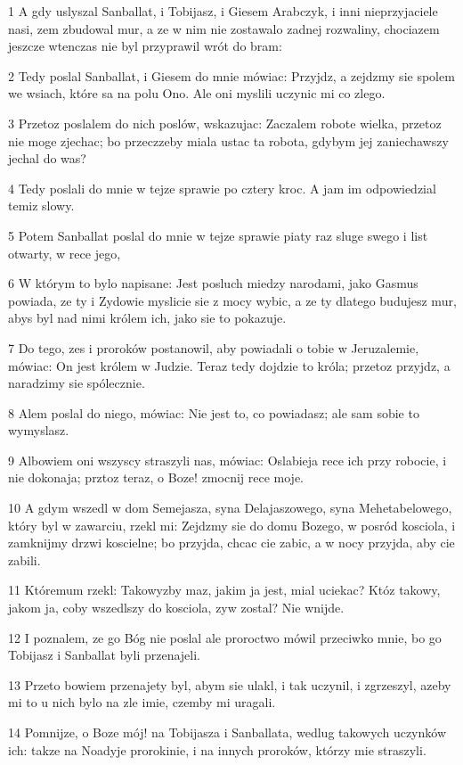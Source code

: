\par 1 A gdy uslyszal Sanballat, i Tobijasz, i Giesem Arabczyk, i inni nieprzyjaciele nasi, zem zbudowal mur, a ze w nim nie zostawalo zadnej rozwaliny, chociazem jeszcze wtenczas nie byl przyprawil wrót do bram:
\par 2 Tedy poslal Sanballat, i Giesem do mnie mówiac: Przyjdz, a zejdzmy sie spolem we wsiach, które sa na polu Ono. Ale oni myslili uczynic mi co zlego.
\par 3 Przetoz poslalem do nich poslów, wskazujac: Zaczalem robote wielka, przetoz nie moge zjechac; bo przeczzeby miala ustac ta robota, gdybym jej zaniechawszy jechal do was?
\par 4 Tedy poslali do mnie w tejze sprawie po cztery kroc. A jam im odpowiedzial temiz slowy.
\par 5 Potem Sanballat poslal do mnie w tejze sprawie piaty raz sluge swego i list otwarty, w rece jego,
\par 6 W którym to bylo napisane: Jest posluch miedzy narodami, jako Gasmus powiada, ze ty i Zydowie myslicie sie z mocy wybic, a ze ty dlatego budujesz mur, abys byl nad nimi królem ich, jako sie to pokazuje.
\par 7 Do tego, zes i proroków postanowil, aby powiadali o tobie w Jeruzalemie, mówiac: On jest królem w Judzie. Teraz tedy dojdzie to króla; przetoz przyjdz, a naradzimy sie spólecznie.
\par 8 Alem poslal do niego, mówiac: Nie jest to, co powiadasz; ale sam sobie to wymyslasz.
\par 9 Albowiem oni wszyscy straszyli nas, mówiac: Oslabieja rece ich przy robocie, i nie dokonaja; prztoz teraz, o Boze! zmocnij rece moje.
\par 10 A gdym wszedl w dom Semejasza, syna Delajaszowego, syna Mehetabelowego, który byl w zawarciu, rzekl mi: Zejdzmy sie do domu Bozego, w posród kosciola, i zamknijmy drzwi koscielne; bo przyjda, chcac cie zabic, a w nocy przyjda, aby cie zabili.
\par 11 Któremum rzekl: Takowyzby maz, jakim ja jest, mial uciekac? Któz takowy, jakom ja, coby wszedlszy do kosciola, zyw zostal? Nie wnijde.
\par 12 I poznalem, ze go Bóg nie poslal ale proroctwo mówil przeciwko mnie, bo go Tobijasz i Sanballat byli przenajeli.
\par 13 Przeto bowiem przenajety byl, abym sie ulakl, i tak uczynil, i zgrzeszyl, azeby mi to u nich bylo na zle imie, czemby mi uragali.
\par 14 Pomnijze, o Boze mój! na Tobijasza i Sanballata, wedlug takowych uczynków ich: takze na Noadyje prorokinie, i na innych proroków, którzy mie straszyli.
